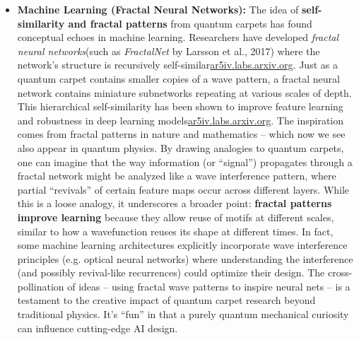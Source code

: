 \documentclass[11pt,a4paper]{article}
\begin{document}
\begin{itemize}
  \item \textbf{Machine Learning (Fractal Neural Networks):} The idea of \textbf{self-similarity and fractal patterns} from quantum carpets has found conceptual echoes in machine learning. Researchers have developed \emph{fractal neural networks}(such as \emph{FractalNet} by Larsson et al., 2017) where the network’s structure is recursively self-similar\href{https://ar5iv.labs.arxiv.org/html/1605.07648#:~:text=We introduce a design strategy,not be fundamental to the}{ar5iv.labs.arxiv.org}. Just as a quantum carpet contains smaller copies of a wave pattern, a fractal neural network contains miniature subnetworks repeating at various scales of depth. This hierarchical self-similarity has been shown to improve feature learning and robustness in deep learning models\href{https://ar5iv.labs.arxiv.org/html/1605.07648#:~:text=We introduce a design strategy,not be fundamental to the}{ar5iv.labs.arxiv.org}. The inspiration comes from fractal patterns in nature and mathematics – which now we see also appear in quantum physics. By drawing analogies to quantum carpets, one can imagine that the way information (or “signal”) propagates through a fractal network might be analyzed like a wave interference pattern, where partial “revivals” of certain feature maps occur across different layers. While this is a loose analogy, it underscores a broader point: \textbf{fractal patterns improve learning} because they allow reuse of motifs at different scales, similar to how a wavefunction reuses its shape at different times. In fact, some machine learning architectures explicitly incorporate wave interference principles (e.g. optical neural networks) where understanding the interference (and possibly revival-like recurrences) could optimize their design. The cross-pollination of ideas – using fractal wave patterns to inspire neural nets – is a testament to the creative impact of quantum carpet research beyond traditional physics. It’s “fun” in that a purely quantum mechanical curiosity can influence cutting-edge AI design.

\end{itemize}
\end{document}
